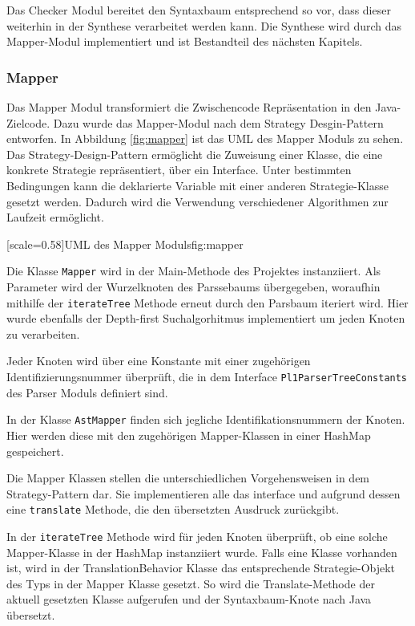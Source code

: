Das Checker Modul bereitet den Syntaxbaum entsprechend so vor, dass dieser weiterhin in der Synthese verarbeitet werden kann.
Die Synthese wird durch das Mapper-Modul implementiert und ist Bestandteil des nächsten Kapitels.
 
 \pagebreak
\subsubsection{Mapper}
Das Mapper Modul transformiert die Zwischencode Repräsentation in den Java-Zielcode. Dazu wurde das Mapper-Modul nach dem Strategy Desgin-Pattern entworfen.
In Abbildung \ref{fig:mapper} ist das UML des Mapper Moduls zu sehen. 
Das Strategy-Design-Pattern ermöglicht die Zuweisung einer Klasse, die eine konkrete Strategie repräsentiert, über ein Interface. Unter bestimmten Bedingungen kann die deklarierte Variable mit einer anderen Strategie-Klasse gesetzt werden. Dadurch wird die Verwendung verschiedener Algorithmen zur Laufzeit ermöglicht. 

[scale=0.58]{UML des Mapper Moduls}{fig:mapper}

Die Klasse \verb+Mapper+ wird in der Main-Methode des Projektes instanziiert. Als Parameter wird der Wurzelknoten des Parssebaums übergegeben,
woraufhin mithilfe der \verb+iterateTree+ Methode erneut durch den Parsbaum iteriert wird. Hier wurde ebenfalls der Depth-first Suchalgorhitmus implementiert um jeden Knoten zu verarbeiten. 

Jeder Knoten wird über eine Konstante mit einer zugehörigen Identifizierungsnummer überprüft, die in dem Interface \verb+Pl1ParserTreeConstants+ des Parser Moduls definiert sind. 

In der Klasse \verb+AstMapper+ finden sich jegliche Identifikationsnummern der Knoten. Hier werden diese mit den zugehörigen Mapper-Klassen in einer HashMap gespeichert.

Die Mapper Klassen stellen die unterschiedlichen Vorgehensweisen in dem Strategy-Pattern dar. Sie implementieren alle das  interface und aufgrund dessen eine \verb+translate+ Methode, die den übersetzten Ausdruck zurückgibt. 

In der \verb+iterateTree+ Methode wird für jeden Knoten überprüft, ob eine solche Mapper-Klasse in der HashMap instanziiert wurde.
Falls eine Klasse vorhanden ist, wird in der TranslationBehavior Klasse das entsprechende Strategie-Objekt
des Typs  in der
Mapper Klasse gesetzt. So wird die Translate-Methode der aktuell gesetzten Klasse aufgerufen und der Syntaxbaum-Knote nach Java übersetzt.

